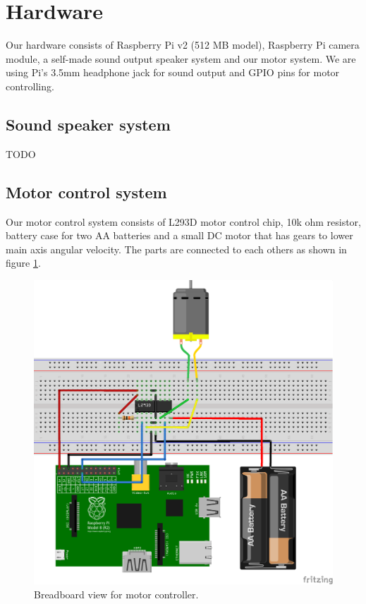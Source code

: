 \documentclass[english,11pt,twoside,a4paper]{article}
\begin{document}
\section{Hardware}

Our hardware consists of Raspberry Pi v2 (512 MB model), Raspberry Pi camera module, a self-made sound output speaker system and our motor system. We are using Pi's 3.5mm headphone jack for sound output and GPIO pins for motor controlling.

\subsection{Sound speaker system}

TODO

\subsection{Motor control system}

Our motor control system consists of L293D motor control chip, 10k ohm resistor, battery case for two AA batteries and a small DC motor that has gears to lower main axis angular velocity. The parts are connected to each others as shown in figure \ref{l293d_bb}.

\begin{figure}
  \begin{center}
    \includegraphics[scale=0.75]{motor_controllers_l293d_impl_bb.png}
    \caption{Breadboard view for motor controller.}
  \end{center}
  \label{l293d_bb}
\end{figure}
\end{document}
